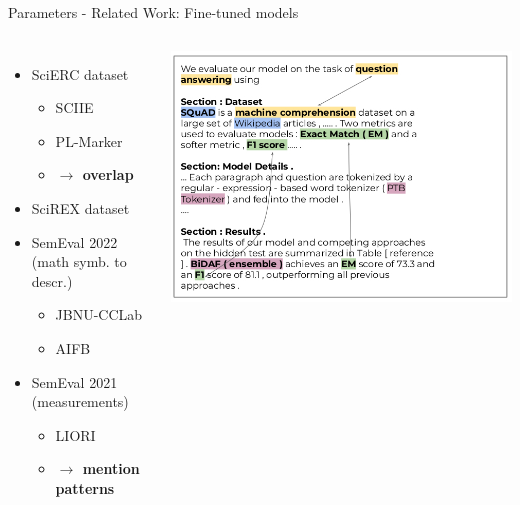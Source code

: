 \documentclass[en,16:9,smallfoot]{sdqbeamer}
\begin{document}
   \begin{frame}{Parameters - Related Work: Fine-tuned models}
   \begin{columns}
           \begin{itemize}
               \item SciERC dataset %
                   \begin{itemize}
                       \item SCIIE~\cite{luan2018scierc}
                       \item PL-Marker~\cite{Ye2022}
                       \item \textbf{$\rightarrow$ overlap}
                   \end{itemize}
               \item {\color{contextgrey}SciREX dataset} %
               \item {\color{contextgrey}SemEval 2022 (math symb. to descr.)}
                   \begin{itemize}
                       \item {\color{contextgrey}JBNU-CCLab~\cite{Lee2022}}
                       \item {\color{contextgrey}AIFB~\cite{Popovic2022}}
                   \end{itemize}
               \item SemEval 2021 (measurements)
                   \begin{itemize}
                       \item LIORI~\cite{Davletov2021}
                       \item \textbf{$\rightarrow$ mention patterns}
                   \end{itemize}
           \end{itemize}
           \begin{center}\includegraphics[width=\textwidth]{imgs/scirex}\end{center}

\end{columns}
\end{frame}
\end{document}
